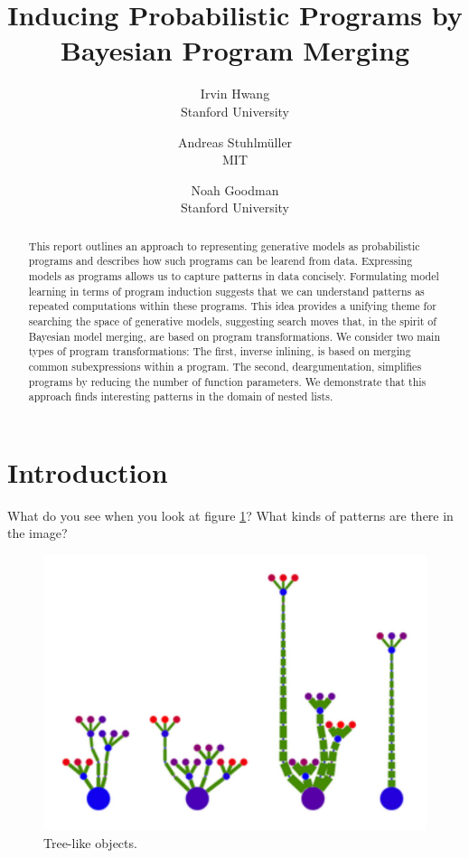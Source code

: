 \documentclass[a4paper,10pt]{article}
\begin{document}
\title{Inducing Probabilistic Programs by Bayesian Program Merging}
\author{Irvin Hwang\\Stanford University  \and Andreas Stuhlm\"{u}ller\\MIT \and Noah Goodman\\Stanford University}
\date{}
\maketitle
\begin{abstract}

This report outlines an approach to representing generative models as probabilistic programs and describes how such programs can be learend from data.  Expressing models as programs allows us to capture patterns in data concisely.  Formulating model learning in terms of program induction suggests that we can understand patterns as repeated computations within these programs. This idea provides a unifying theme for searching the space of generative models, suggesting search moves that, in the spirit of Bayesian model merging, are based on program transformations. We consider two main types of program transformations: The first, inverse inlining, is based on merging common subexpressions within a program. The second, deargumentation, simplifies programs by reducing the number of function parameters. We demonstrate that this approach finds interesting patterns in the domain of nested lists.

\end{abstract}



\section{Introduction}


What do you see when you look at figure \ref{fig:plants}? What kinds of patterns are there in the image? 
\begin{figure}[h]
\begin{center}
\includegraphics[scale=.60]{trees.pdf}
\end{center}
\caption{Tree-like objects.}
\label{fig:plants}
\end{figure}
\end{document}
